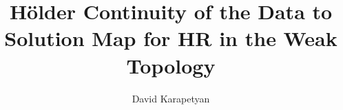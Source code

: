 \documentclass[12pt,reqno]{amsart}
\numberwithin{equation}{section}  %
\numberwithin{figure}{section}
\begin{document}
\title[H\"older Continuity of the Data to Solution Map for HR]{H\"older Continuity of the Data to Solution Map for HR in the
Weak Topology}
\author{David Karapetyan}
\address{Department of Mathematics  \\
    University  of Notre Dame\\
        Notre Dame, IN 46556 }
        \date{}
        
        
        



        
        \maketitle
\end{document}
